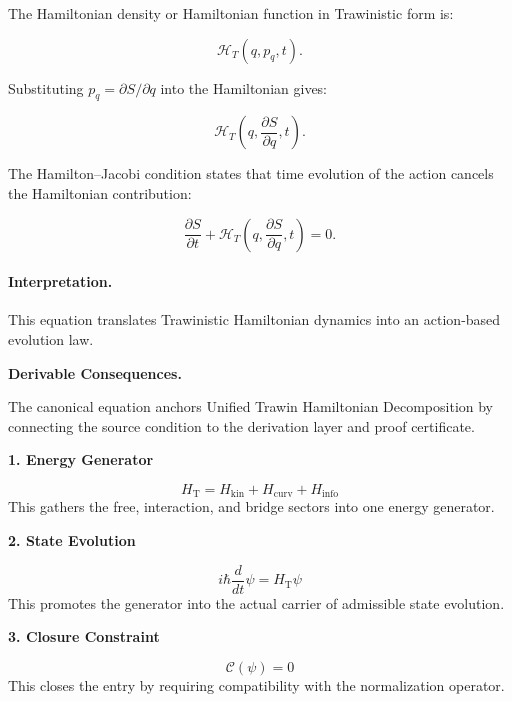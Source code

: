 The Hamiltonian density or Hamiltonian function in Trawinistic form is:

\begin{equation}
\mathcal{H}_T(q,p_q,t).
\end{equation}

Substituting $p_q=\partial S/\partial q$ into the Hamiltonian gives:

\begin{equation}
\mathcal{H}_T
\left(
q,\frac{\partial S}{\partial q},t
\right).
\end{equation}

The Hamilton--Jacobi condition states that time evolution of the action cancels the Hamiltonian contribution:

\begin{equation}
\boxed{
\frac{\partial S}{\partial t}
+
\mathcal{H}_T
\left(
q,\frac{\partial S}{\partial q},t
\right)
=
0 .
}
\end{equation}

\paragraph{Interpretation.}
This equation translates Trawinistic Hamiltonian dynamics into an action-based evolution law.

\par\vspace{0.35em}
\noindent\textbf{Derivable Consequences.}\quad
\begingroup
\footnotesize
\raggedright
The canonical equation anchors Unified Trawin Hamiltonian Decomposition by connecting the source condition to the derivation layer and proof certificate.
\par\endgroup

\noindent\textbf{1. Energy Generator}\par
\[
H_{\mathrm{T}}=H_{\mathrm{kin}}+H_{\mathrm{curv}}+H_{\mathrm{info}}
\]
\noindent This gathers the free, interaction, and bridge sectors into one energy generator.\par
\noindent\textbf{2. State Evolution}\par
\[
i\hbar\frac{d}{dt}\psi=H_{\mathrm{T}}\psi
\]
\noindent This promotes the generator into the actual carrier of admissible state evolution.\par
\noindent\textbf{3. Closure Constraint}\par
\[
\mathcal{C}(\psi)=0
\]
\noindent This closes the entry by requiring compatibility with the normalization operator.\par

